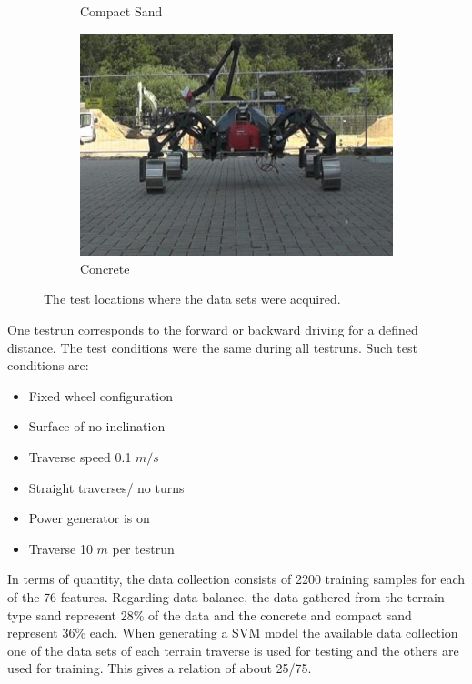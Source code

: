 \documentclass{article}
\begin{document}
\begin{figure}[!htb]
\begin{subfigure}[t]{0.32\textwidth}
        \caption{Compact Sand}
    \end{subfigure}
    \begin{subfigure}[t]{0.32\textwidth}
        \includegraphics[width=\textwidth]{../figures/concrete_v2.png}
        \caption{Concrete}
    \end{subfigure}
 \caption{The test locations where the data sets were acquired.}
 \label{fig:TestLocs}
\end{figure}


 
One testrun corresponds to the forward or backward driving for a defined distance. The test conditions were the same during all testruns. Such test conditions are:
\begin{itemize}
\item Fixed wheel configuration
\item Surface of no inclination
\item Traverse speed 0.1 $m/s$
\item Straight traverses/ no turns
\item Power generator is on
\item Traverse 10 $m$ per testrun
\end{itemize}

In terms of quantity, the data collection consists of 2200 training samples for each of the 76 features. Regarding data balance, the data gathered from the terrain type sand represent 28\% of the data and the concrete and compact sand represent 36\% each. 
When generating a SVM model the available data collection one of the data sets of each terrain traverse is used for testing and the others are used for training. This gives a relation of about 25/75.
\end{document}
